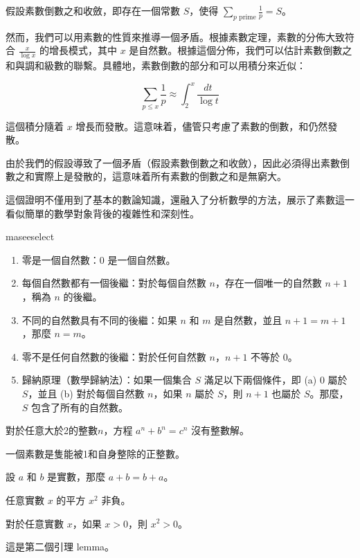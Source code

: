 \documentclass[
    writingLanguage=chinese, %
    addPageTitle=on,  %
    addDeclaration=on, %
    addMUSTlog=on, %
    addFigTOC=on, %
    addTabTOC=on, %
    refIndent=off, %
    printMod=off, %
]{must}
\begin{document}
假設素數倒數之和收斂，即存在一個常數 \( S \)，使得 \( \sum_{p \text{ prime}} \frac{1}{p} = S \)。

然而，我們可以用素數的性質來推導一個矛盾。根據素數定理，素數的分佈大致符合 \( \frac{x}{\log x} \) 的增長模式，其中 \( x \) 是自然數。根據這個分佈，我們可以估計素數倒數之和與調和級數的聯繫。具體地，素數倒數的部分和可以用積分來近似：

\[
\sum_{p \leq x} \frac{1}{p} \approx \int_2^x \frac{dt}{\log t}
\]

這個積分隨着 \( x \) 增長而發散。這意味着，儘管只考慮了素數的倒數，和仍然發散。

由於我們的假設導致了一個矛盾（假設素數倒數之和收斂），因此必須得出素數倒數之和實際上是發散的，這意味着所有素數的倒數之和是無窮大。

這個證明不僅用到了基本的數論知識，還融入了分析數學的方法，展示了素數這一看似簡單的數學對象背後的複雜性和深刻性。
\begin{axiom}[皮亞諾公理 1]
maseeselect
\begin{enumerate}[label=\Alph*.]
\item 零是一個自然數：$0$ 是一個自然數。
\item 每個自然數都有一個後繼：對於每個自然數 $n$，存在一個唯一的自然數 $n+1$，稱為 $n$ 的後繼。
\item 不同的自然數具有不同的後繼：如果 $n$ 和 $m$ 是自然數，並且 $n+1 = m+1$，那麼 $n = m$。
\item 零不是任何自然數的後繼：對於任何自然數 $n$，$n+1$ 不等於 $0$。
\item 歸納原理（數學歸納法）：如果一個集合 $S$ 滿足以下兩個條件，即 (a) $0$ 屬於 $S$，並且 (b) 對於每個自然數 $n$，如果 $n$ 屬於 $S$，則 $n+1$ 也屬於 $S$。那麼，$S$ 包含了所有的自然數。
\end{enumerate}
\end{axiom}

\begin{theorem}[費馬定理]
對於任意大於2的整數$n$，方程 $a^n + b^n = c^n$ 沒有整數解。
\end{theorem}

\begin{definition}
    一個素數是隻能被1和自身整除的正整數。
\end{definition}
\begin{example}
    設 $a$ 和 $b$ 是實數，那麼 $a+b=b+a$。
\end{example}

\begin{property}
    任意實數 $x$ 的平方 $x^2$ 非負。
\end{property}
\begin{proposition}
    對於任意實數 $x$，如果 $x > 0$，則 $x^2 > 0$。
\end{proposition}
\begin{lemma}
這是第二個引理 lemma。
\end{lemma}
\end{document}
